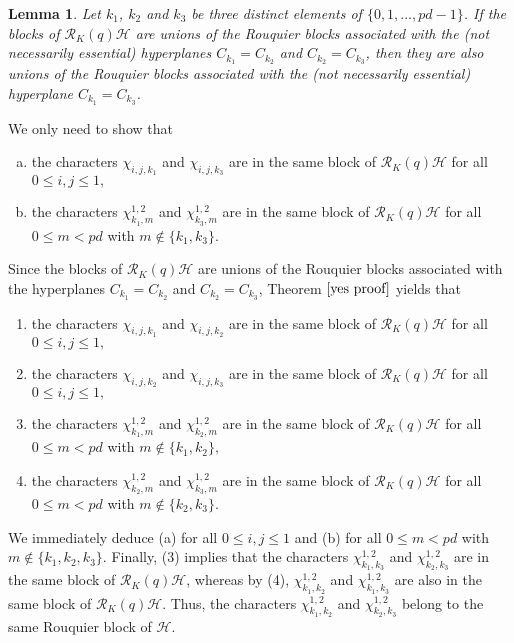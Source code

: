 \documentclass[10pt,a4paper,titlepage]{article}
\newtheorem{lemma}[theorem]{Lemma}
\begin{document}
\begin{lemma}\label{three hyperplanes}
Let $k_1$, $k_2$ and $k_3$ be three distinct elements
of  $\{0,1,\ldots,pd-1\}$. If  the blocks of $\mathcal{R}_K(q)\mathcal{H}$ are unions of the Rouquier blocks associated with the (not necessarily essential) hyperplanes $C_{k_1}=C_{k_2}$ and $C_{k_2}=C_{k_3}$, then they are also unions of the Rouquier blocks associated with the (not necessarily essential) hyperplane
 $C_{k_1}=C_{k_3}$.
\end{lemma}
\begin{apod}{We only need to show that
\begin{enumerate}[(a)]
\item the characters $\chi_{i,j,k_1}$ and $\chi_{i,j,k_3}$ are in the same block of $\mathcal{R}_K(q)\mathcal{H}$ for all $0 \leq i,j \leq 1,$
\item the characters $\chi_{k_1,m}^{1,2}$ and $\chi_{k_3,m}^{1,2}$
are in the same block of $\mathcal{R}_K(q)\mathcal{H}$ for all
 $0 \leq m <pd$ with  $m \notin \{k_1,k_3\}.$
\end{enumerate}
Since the blocks of $\mathcal{R}_K(q)\mathcal{H}$ are unions of the Rouquier blocks associated with the  hyperplanes $C_{k_1}=C_{k_2}$ and $C_{k_2}=C_{k_3}$, Theorem $\ref{yes proof}$ yields that
\begin{enumerate}[(1)]
\item the characters $\chi_{i,j,k_1}$ and $\chi_{i,j,k_2}$ are in the same block of $\mathcal{R}_K(q)\mathcal{H}$ for all $0 \leq i,j \leq 1,$
\item the characters $\chi_{i,j,k_2}$ and $\chi_{i,j,k_3}$ are in the same block of $\mathcal{R}_K(q)\mathcal{H}$ for all $0 \leq i,j \leq 1,$
\item the characters $\chi_{k_1,m}^{1,2}$ and $\chi_{k_2,m}^{1,2}$
are in the same block of $\mathcal{R}_K(q)\mathcal{H}$ for all
 $0 \leq m <pd$ with  $m \notin \{k_1,k_2\},$
\item the characters $\chi_{k_2,m}^{1,2}$ and $\chi_{k_3,m}^{1,2}$
are in the same block of $\mathcal{R}_K(q)\mathcal{H}$ for all
 $0 \leq m <pd$ with  $m \notin \{k_2,k_3\}.$
\end{enumerate}
We immediately deduce (a) for all $0 \leq i,j \leq 1$ and (b) for all $0 \leq m <pd$ with $m \notin \{k_1,k_2,k_3\}.$
Finally, (3) implies that the characters $\chi_{k_1,k_3}^{1,2}$ and $\chi_{k_2,k_3}^{1,2}$
are in the same block of $\mathcal{R}_K(q)\mathcal{H}$, whereas by (4), $\chi_{k_1,k_2}^{1,2}$ and $\chi_{k_1,k_3}^{1,2}$ are also in the same block of $\mathcal{R}_K(q)\mathcal{H}$.
Thus, the characters $\chi_{k_1,k_2}^{1,2}$ and $\chi_{k_2,k_3}^{1,2}$ belong to the same Rouquier block of $\mathcal{H}$.}
\end{apod}
\end{document}

